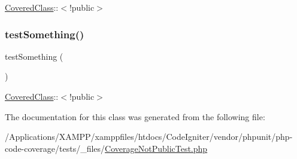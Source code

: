 \mbox{\hyperlink{class_covered_class}{Covered\+Class}}\+:\+:$<$!public$>$ \mbox{\label{class_coverage_not_public_test_a0fc4e17369bc9607ebdd850d9eda8167}} 
\subsubsection{\texorpdfstring{test\+Something()}{testSomething()}\hspace{0.1cm}{\footnotesize\ttfamily [2/2]}}
{\footnotesize\ttfamily test\+Something (\begin{DoxyParamCaption}{ }\end{DoxyParamCaption})}

\mbox{\hyperlink{class_covered_class}{Covered\+Class}}\+:\+:$<$!public$>$ 

The documentation for this class was generated from the following file\+:\begin{DoxyCompactItemize}
\item 
/\+Applications/\+X\+A\+M\+P\+P/xamppfiles/htdocs/\+Code\+Igniter/vendor/phpunit/php-\/code-\/coverage/tests/\+\_\+files/\mbox{\hyperlink{php-code-coverage_2tests_2__files_2_coverage_not_public_test_8php}{Coverage\+Not\+Public\+Test.\+php}}\end{DoxyCompactItemize}
